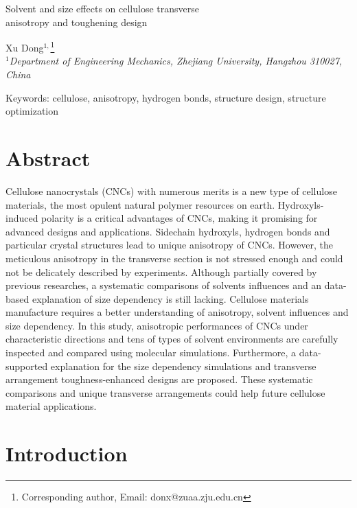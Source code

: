 \documentclass{article}
\begin{document}
\begin{center}
\LARGE Solvent and size effects on cellulose transverse\\
anisotropy and toughening design\\
\end{center}

\begin{center}
\renewcommand{\thefootnote}{\fnsymbol{footnote}}
Xu Dong$^{1,}$\footnote{Corresponding author, Email: donx@zuaa.zju.edu.cn}\\
$^{1}$\textit{Department of Engineering Mechanics, Zhejiang University, Hangzhou 310027, China}
\end{center}

\begin{center}
Keywords: cellulose, anisotropy, hydrogen bonds, structure design, structure optimization
\end{center}

\section*{Abstract}
\indent

Cellulose nanocrystals (CNCs) with numerous merits is a new type of cellulose materials, the most opulent natural polymer resources on earth.
Hydroxyls-induced polarity is a critical advantages of CNCs, making it promising for advanced designs and applications.
Sidechain hydroxyls, hydrogen bonds and particular crystal structures lead to unique anisotropy of CNCs.
However, the meticulous anisotropy in the transverse section is not stressed enough and could not be delicately described by experiments.
Although partially covered by previous researches, a systematic comparisons of solvents influences and an data-based explanation of size dependency is still lacking.
Cellulose materials manufacture requires a better understanding of anisotropy, solvent influences and size dependency.
In this study, anisotropic performances of CNCs under characteristic directions and tens of types of solvent environments are carefully inspected and compared using molecular simulations.
Furthermore, a data-supported explanation for the size dependency simulations and transverse arrangement toughness-enhanced designs are proposed.
These systematic comparisons and unique transverse arrangements could help future cellulose material applications.

\section*{Introduction}
\addtocounter{section}{1}
\setcounter{subsection}{0}
\indent
\end{document}
